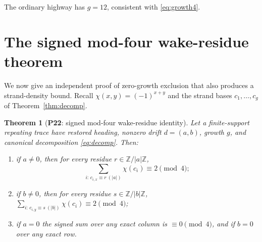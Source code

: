 \documentclass[11pt,reqno]{amsart}
\theoremstyle{plain}
\newtheorem{theorem}{Theorem}[section]
\theoremstyle{definition}
\newcommand{\Z}{\mathbb{Z}}
\newcommand{\che}{\chi}                 %
\newcommand{\drift}{d}
\newcommand{\growth}{g}
\newcommand{\PN}[1]{\textbf{P#1}}
\begin{document}
The ordinary highway has $\growth=12$, consistent with \eqref{eq:growth4}.

\section{The signed mod-four wake-residue theorem}\label{sec:residue}

We now give an independent proof of zero-growth exclusion that also produces a
strand-density bound. Recall $\che(x,y)=(-1)^{x+y}$ and the strand bases
$c_1,\dots,c_\growth$ of Theorem~\ref{thm:decomp}.

\begin{theorem}[\PN{22}: signed mod-four wake-residue identity]\label{thm:residue}
Let a finite-support repeating trace have restored heading, nonzero drift
$\drift=(a,b)$, growth $\growth$, and canonical decomposition
\eqref{eq:decomp}. Then:
\begin{enumerate}[label=\textup{(\roman*)}]
\item if $a\neq0$, then for every residue $r\in\Z/|a|\Z$,
\begin{equation}\label{eq:res-a}
\sum_{i:\,c_{i,x}\equiv r\ (|a|)}\che(c_i)\equiv 2\pmod4;
\end{equation}
\item if $b\neq0$, then for every residue $s\in\Z/|b|\Z$,
$\displaystyle\sum_{i:\,c_{i,y}\equiv s\ (|b|)}\che(c_i)\equiv2\pmod4$;
\item if $a=0$ the signed sum over any exact column is $\equiv0\pmod4$, and if
$b=0$ over any exact row.
\end{enumerate}
\end{theorem}
\end{document}
